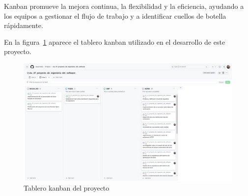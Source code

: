 Kanban promueve la mejora continua, la flexibilidad y la eficiencia, ayudando a los equipos a gestionar el flujo de
trabajo y a identificar cuellos de botella rápidamente.

En la figura~\ref{fig:chapter_3.kanban} aparece el tablero kanban utilizado en el desarrollo de este proyecto.

\begin{figure}[ht]
    \begin{center}
        \includegraphics[width=\textwidth]{./chapter/3/images/chapter_3.kanban}
        \caption{Tablero kanban del proyecto}
        \label{fig:chapter_3.kanban}
    \end{center}
\end{figure}